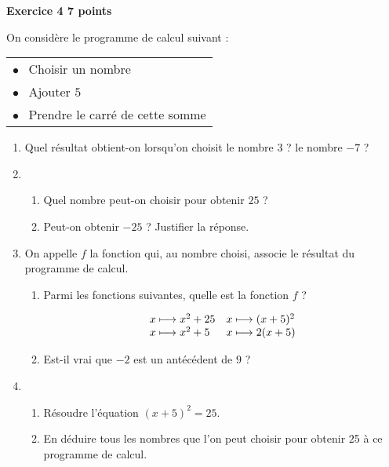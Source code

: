 \textbf{Exercice 4 \hfill 7 points}

\medskip
 
On considère le programme de calcul suivant : 

\begin{center}
\begin{tabular}{|l|}\hline
$\bullet~~$ Choisir un nombre\\
$\bullet~~$ Ajouter $5$\\
$\bullet~~$ Prendre le carré de cette somme\\ \hline
\end{tabular}
\end{center}

\begin{enumerate}
\item Quel résultat obtient-on lorsqu'on choisit le nombre $3$ ? le nombre $- 7$ ? 
\item 
	\begin{enumerate}
		\item Quel nombre peut-on choisir pour obtenir $25$ ? 
		\item Peut-on obtenir $- 25$ ? Justifier la réponse.
	\end{enumerate} 
\item On appelle $f$ la fonction qui, au nombre choisi, associe le résultat du programme de calcul. 
	\begin{enumerate}
		\item Parmi les fonctions suivantes, quelle est la fonction $f$ ? 

\[\begin{array}{l l}
	x \longmapsto x^2 + 25 &	x \longmapsto (x + 5)^2\\ 
	x \longmapsto x^2 + 5& 	x \longmapsto 2(x + 5)
	\end{array}\]
	 
		\item Est-il vrai que $- 2$ est un antécédent de $9$ ? 
	\end{enumerate}		
\item
	\begin{enumerate}
		\item Résoudre l'équation $(x + 5)^2 = 25$. 
		\item En déduire tous les nombres que l'on peut choisir pour obtenir $2$5 à ce programme de calcul. 
	\end{enumerate}
\end{enumerate}

\bigskip

